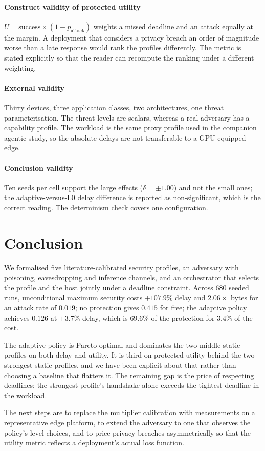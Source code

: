 \documentclass[journal,10pt]{IEEEtran}
\begin{document}
\paragraph{Construct validity of protected utility}
$U=\text{success}\times(1-\overline{p_{\text{attack}}})$ weights a missed
deadline and an attack equally at the margin. A deployment that considers a
privacy breach an order of magnitude worse than a late response would rank the
profiles differently. The metric is stated explicitly so that the reader can
recompute the ranking under a different weighting.

\paragraph{External validity}
Thirty devices, three application classes, two architectures, one threat
parameterisation. The threat levels are scalars, whereas a real adversary has a
capability profile. The workload is the same proxy profile used in the
companion agentic study, so the absolute delays are not transferable to a
GPU-equipped edge.

\paragraph{Conclusion validity}
Ten seeds per cell support the large effects ($\delta=\pm1.00$) and not the
small ones; the adaptive-versus-L0 delay difference is reported as
non-significant, which is the correct reading. The determinism check covers one
configuration.

\section{Conclusion}
\label{sec:concl}

We formalised five literature-calibrated security profiles, an adversary with
poisoning, eavesdropping and inference channels, and an orchestrator that
selects the profile and the host jointly under a deadline constraint. Across
$680$ seeded runs, unconditional maximum security costs $+107.9\%$ delay and
$2.06\times$ bytes for an attack rate of $0.019$; no protection gives $0.415$
for free; the adaptive policy achieves $0.126$ at $+3.7\%$ delay, which is
$69.6\%$ of the protection for $3.4\%$ of the cost.

The adaptive policy is Pareto-optimal and dominates the two middle static
profiles on both delay and utility. It is third on protected utility behind the
two strongest static profiles, and we have been explicit about that rather than
choosing a baseline that flatters it. The remaining gap is the price of
respecting deadlines: the strongest profile's handshake alone exceeds the
tightest deadline in the workload.

The next steps are to replace the multiplier calibration with measurements on a
representative edge platform, to extend the adversary to one that observes the
policy's level choices, and to price privacy breaches asymmetrically so that the
utility metric reflects a deployment's actual loss function.

\balance


\end{document}
